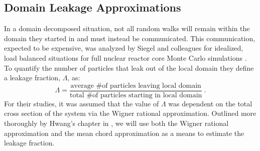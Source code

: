 \documentclass[preprint,11pt]{elsarticle}
\begin{document}
\subsection{Domain Leakage Approximations}
\label{subsec:domain_leak_approx}

In a domain decomposed situation, not all random walks will remain within the
domain they started in and must instead be communicated. This communication,
expected to be expensive, was analyzed by Siegel and colleagues for idealized,
load balanced situations for full nuclear reactor core Monte Carlo simulations
\cite{siegel_analysis_2012}.  To quantify the number of particles that leak
out of the local domain they define a leakage fraction, $\Lambda$, as:
\begin{equation}
  \Lambda = \frac{\text{average \# of particles leaving local domain}}
          {\text{total \# of particles starting in local domain}}\:.
          \label{eq:leakage_fraction}
\end{equation}
For their studies, it was assumed that the value of $\Lambda$ was dependent on
the total cross section of the system via the Wigner rational
approximation. Outlined more thoroughly by Hwang's chapter in
\cite{azmy_nuclear_2010}, we will use both the Wigner rational approximation
and the mean chord approximation as a means to estimate the leakage fraction.
\end{document}
